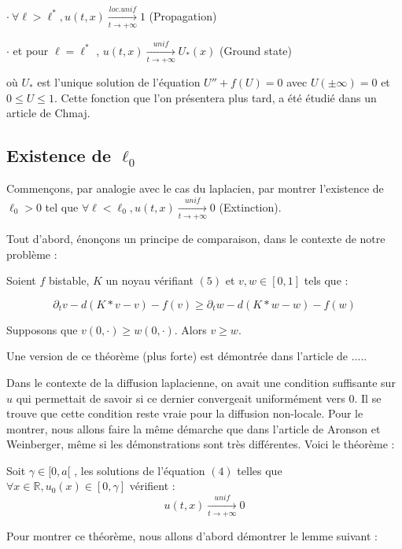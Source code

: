 \documentclass{article}
\begin{document}
$\cdot ~\forall \ell > \ell^* , u(t,x) \underset{t \to +\infty}{\overset{loc. unif}{\longrightarrow}}1$ (Propagation)

$\cdot$ et pour $\ell = \ell^* $ , $u(t,x) \underset{t \to +\infty}{\overset{unif}{\longrightarrow}}U_{*}(x)$ (Ground state)

\noindent où $U_*$ est l'unique solution de l'équation $U'' + f(U) = 0$ avec $U(\pm \infty) = 0$ et $ 0 \le U \le 1 $. Cette fonction que l'on présentera plus tard, a été étudié dans un article de Chmaj. 

\subsection{Existence de $\ell_0$}

Commençons, par analogie avec le cas du laplacien, par montrer l'existence de $\ell_0>0$ tel que $\forall \ell < \ell_0 , u(t,x) \underset{t \to +\infty}{\overset{unif}{\longrightarrow}}0$ (Extinction). \newline

Tout d'abord, énonçons un principe de comparaison, dans le contexte de notre problème : \newline
\begin{Theoreme}
Soient $f$ bistable, $K$ un noyau vérifiant $(5)$ et $v,w \in [0,1]$ tels que :

\begin{equation*}
\partial_t v - d(K*v - v) - f(v) \geq \partial_t w - d(K*w - w) - f(w)
\end{equation*}

Supposons que  $v(0,\cdot) \ge w(0,\cdot)$. Alors $v \ge w$.
\end{Theoreme}

Une version de ce théorème (plus forte) est démontrée dans l'article de .....\newline

Dans le contexte de la diffusion laplacienne, on avait une condition suffisante sur $u$ qui permettait de savoir si ce dernier convergeait uniformément vers 0. Il se trouve que cette condition reste vraie pour la diffusion non-locale. Pour le montrer, nous allons faire la même démarche que dans l'article de Aronson et Weinberger, même si les démonstrations sont très différentes. Voici le théorème : \newline

\begin{Theoreme}
Soit $\gamma \in [0,a[$ , les solutions de l'équation $(4)$ telles que $\forall x \in \mathbb{R}, u_0(x) \in [0,\gamma] $ vérifient :
\begin{equation*}
u(t,x) \underset{t \to +\infty}{\overset{unif}{\longrightarrow}}0
\end{equation*}
\end{Theoreme}
Pour montrer ce théorème, nous allons d'abord démontrer le lemme suivant : \newline 
\end{document}
